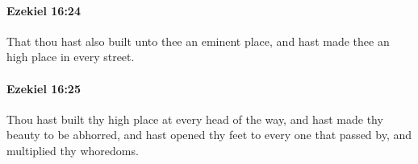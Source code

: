 		\paragraph{Ezekiel 16:24} %
			\label{EZEKIEL-16-24}

			That thou hast also built unto thee an eminent place, and hast made thee an high place in every street.


		\paragraph{Ezekiel 16:25} %
			\label{EZEKIEL-16-25}

			Thou hast built thy high place at every head of the way, and hast made thy beauty to be abhorred, and hast opened thy feet to every one that passed by, and multiplied thy whoredoms.


